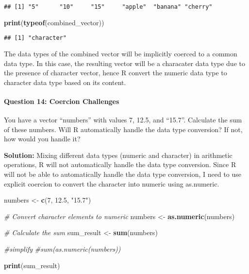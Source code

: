 \documentclass[
]{article}
\newenvironment{Shaded}{\begin{snugshade}}{\end{snugshade}}
\newcommand{\CommentTok}[1]{\textcolor[rgb]{0.56,0.35,0.01}{\textit{#1}}}
\newcommand{\DecValTok}[1]{\textcolor[rgb]{0.00,0.00,0.81}{#1}}
\newcommand{\FloatTok}[1]{\textcolor[rgb]{0.00,0.00,0.81}{#1}}
\newcommand{\FunctionTok}[1]{\textcolor[rgb]{0.13,0.29,0.53}{\textbf{#1}}}
\newcommand{\NormalTok}[1]{#1}
\newcommand{\OtherTok}[1]{\textcolor[rgb]{0.56,0.35,0.01}{#1}}
\newcommand{\StringTok}[1]{\textcolor[rgb]{0.31,0.60,0.02}{#1}}
\begin{document}
\begin{verbatim}
## [1] "5"      "10"     "15"     "apple"  "banana" "cherry"
\end{verbatim}

\begin{Shaded}
\begin{Highlighting}[]
\FunctionTok{print}\NormalTok{(}\FunctionTok{typeof}\NormalTok{(combined\_vector))}
\end{Highlighting}
\end{Shaded}

\begin{verbatim}
## [1] "character"
\end{verbatim}

The data types of the combined vector will be implicitly coerced to a
common data type. In this case, the resulting vector will be a
characater data type due to the presence of character vector, hence R
convert the numeric data type to character data type based on its
content.

\hypertarget{question-14-coercion-challenges}{%
\paragraph{Question 14: Coercion
Challenges}\label{question-14-coercion-challenges}}

You have a vector ``numbers'' with values 7, 12.5, and ``15.7''.
Calculate the sum of these numbers. Will R automatically handle the data
type conversion? If not, how would you handle it?

\textbf{Solution:} Mixing different data types (numeric and character)
in arithmetic operations, R will not automatically handle the data type
conversion. Since R will not be able to automatically handle the data
type conversion, I need to use explicit coercion to convert the
character into numeric using as.numeric.

\begin{Shaded}
\begin{Highlighting}[]
\NormalTok{ numbers }\OtherTok{\textless{}{-}} \FunctionTok{c}\NormalTok{(}\DecValTok{7}\NormalTok{, }\FloatTok{12.5}\NormalTok{, }\StringTok{"15.7"}\NormalTok{)}

\CommentTok{\# Convert character elements to numeric}
\NormalTok{numbers }\OtherTok{\textless{}{-}} \FunctionTok{as.numeric}\NormalTok{(numbers)}

\CommentTok{\# Calculate the sum}
\NormalTok{sum\_result }\OtherTok{\textless{}{-}} \FunctionTok{sum}\NormalTok{(numbers)}

\CommentTok{\#simplify }
\CommentTok{\#sum(as.numeric(numbers))}

\FunctionTok{print}\NormalTok{(sum\_result)}
\end{Highlighting}
\end{Shaded}
\end{document}
